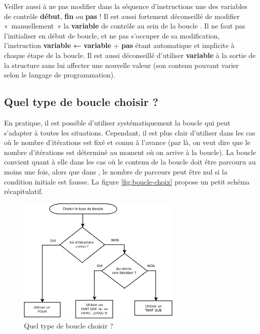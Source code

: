 		Veiller aussi à ne pas modifier dans la séquence d’instructions une des
		variables de contrôle \textbf{début}, \textbf{fin} ou \textbf{pas} ! Il
		est aussi fortement déconseillé de modifier «~manuellement~» la
		\textbf{variable} de contrôle au sein de la boucle
		. Il ne faut pas l’initialiser en début de boucle,
		et ne pas s’occuper de sa modification, l’instruction \textbf{variable}
		{\textsf{\textbf{←}}} \textbf{variable} +
		\textbf{pas} étant automatique et implicite à chaque étape de la
		boucle. Il est aussi déconseillé d’utiliser \textbf{variable} à la
		sortie de la structure  sans lui affecter une
		nouvelle valeur (son contenu pouvant varier selon le langage de
		programmation).

	\subsection{Quel type de boucle choisir ?}

		En pratique, il est possible d’utiliser systématiquement la boucle 
		 qui peut s’adapter à toutes les situations. 
		Cependant, il est plus clair d’utiliser  dans les cas 
		où le nombre d’itérations est fixé et connu à l’avance 
		(par là, on veut dire que le nombre d'itérations est déterminé au moment 
		où on arrive à la boucle). 
		La boucle  convient quant à elle
		dans les cas où le contenu de la boucle doit être parcouru au moins une
		fois, alors que dans , 
		le nombre de parcours peut être nul si la condition initiale est fausse. 
		La figure \vref{fig:boucle-choix} propose un petit schéma récapitulatif.

		\begin{figure}[h]
		\centering
		\includegraphics[width=0.7\textwidth]{image/boucle-choixtype}
		\caption{Quel type de boucle choisir ?}
		\label{fig:boucle-choix}
		\end{figure}

